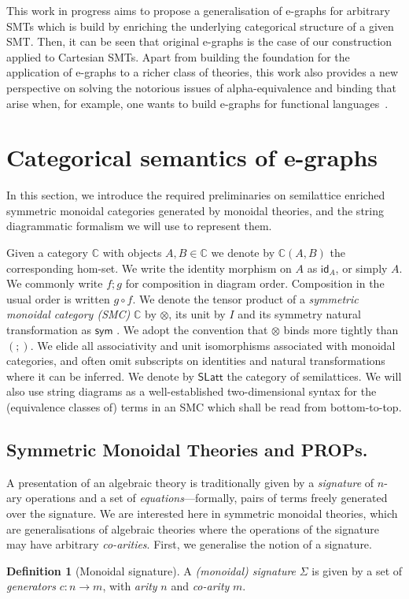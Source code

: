 \documentclass[sigconf, 9pt, nonacm]{acmart}
\theoremstyle{definition}
\newtheorem{definition}[thm]{Definition}
\newcommand\id{\textsf{id}}
\newcommand\sym{\textsf{sym}}
\begin{document}
This work in progress aims to propose a generalisation of e-graphs for arbitrary SMTs which is build by enriching the underlying categorical structure of a given SMT.
Then, it can be seen that original e-graphs is the case of our construction applied to Cartesian SMTs.
Apart from building the foundation for the application of e-graphs to a richer class of theories, this work also provides a new perspective on solving the notorious issues of alpha-equivalence and binding that arise when, for example, one wants to build e-graphs for functional languages~\cite{koehler2022sketchguided}.

\section{Categorical semantics of e-graphs}

In this section,  we introduce the required preliminaries on semilattice enriched symmetric monoidal categories generated by monoidal theories,  and the string diagrammatic formalism we will use to represent them.  

Given a category $\mathbb{C}$  with objects $A,B \in \mathbb{C}$ we denote by $\mathbb{C}(A,B)$ the corresponding hom-set.  We write the identity morphism on $A$ as $\id_A$,  or simply $A$.  We commonly write $f;g$ for composition in diagram order.  Composition in the usual order is written $g \circ f$.  We denote the tensor product of a \textit{symmetric monoidal category (SMC)} $\mathbb{C}$ by $\otimes$,  its unit by $I$ and its symmetry natural transformation as $\sym$ \cite{maclane}.  We adopt the convention that $\otimes$ binds more tightly than $(;\!)$.  We elide all associativity and unit isomorphisms associated with monoidal categories,  and often omit subscripts on identities and natural transformations where it can be inferred.  We denote by $\textsf{SLatt}$ the category of semilattices.
We will also use string diagrams as a well-established two-dimensional syntax for the (equivalence classes of) terms in an SMC which shall be read from bottom-to-top.


\subsection{Symmetric Monoidal Theories and PROPs.}

A presentation of an algebraic theory is traditionally given by a \textit{signature} of $n$-ary operations and a set of \textit{equations}---formally,  pairs of terms freely generated over the signature.  We are interested here in symmetric monoidal theories, which are generalisations of algebraic theories where the operations of the signature may have arbitrary \textit{co-arities}.  First,  we generalise the notion of a signature. 
\begin{definition}[Monoidal signature]
A \textit{(monoidal) signature} $\Sigma$ is given by a set of \textit{generators} $c: n \to m$,  with \textit{arity} $n$ and \textit{co-arity} $m$.  %
\end{definition}
\end{document}
